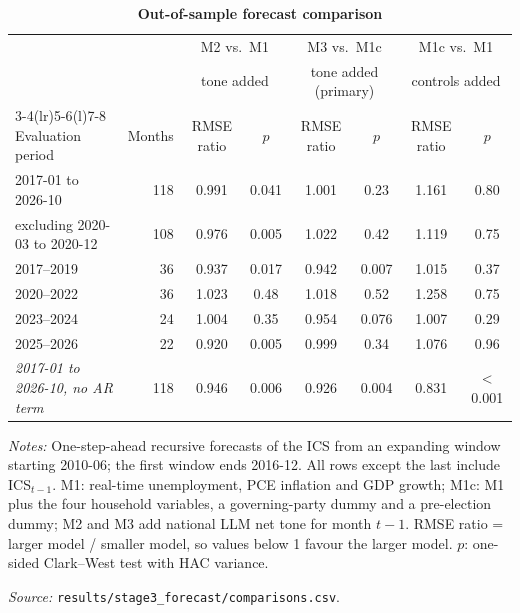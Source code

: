 \begin{table}[htbp]
\centering
\begin{threeparttable}
\caption{\textbf{Out-of-sample forecast comparison}}
\label{tab:forecast}
\small
\begin{tabular}{@{}l r c c c c c c@{}}
\toprule
 & & \multicolumn{2}{c}{M2 vs.\ M1} & \multicolumn{2}{c}{M3 vs.\ M1c} & \multicolumn{2}{c}{M1c vs.\ M1} \\
 & & \multicolumn{2}{c}{tone added} & \multicolumn{2}{c}{tone added (primary)} & \multicolumn{2}{c}{controls added} \\
\cmidrule(lr){3-4}\cmidrule(lr){5-6}\cmidrule(l){7-8}
Evaluation period & Months & RMSE ratio & $p$ & RMSE ratio & $p$ & RMSE ratio & $p$ \\
\midrule
2017-01 to 2026-10 & 118 & 0.991 & 0.041 & 1.001 & 0.23 & 1.161 & 0.80 \\
\quad excluding 2020-03 to 2020-12 & 108 & 0.976 & 0.005 & 1.022 & 0.42 & 1.119 & 0.75 \\
2017--2019 & 36 & 0.937 & 0.017 & 0.942 & 0.007 & 1.015 & 0.37 \\
2020--2022 & 36 & 1.023 & 0.48 & 1.018 & 0.52 & 1.258 & 0.75 \\
2023--2024 & 24 & 1.004 & 0.35 & 0.954 & 0.076 & 1.007 & 0.29 \\
2025--2026 & 22 & 0.920 & 0.005 & 0.999 & 0.34 & 1.076 & 0.96 \\
\addlinespace
\textit{2017-01 to 2026-10, no AR term} & 118 & 0.946 & 0.006 & 0.926 & 0.004 & 0.831 & < 0.001 \\
\bottomrule
\end{tabular}
\begin{tablenotes}[flushleft]\footnotesize
\item \textit{Notes:} One-step-ahead recursive forecasts of the ICS from an expanding window starting 2010-06; the first window ends 2016-12. All rows except the last include ICS$_{t-1}$. M1: real-time unemployment, PCE inflation and GDP growth; M1c: M1 plus the four household variables, a governing-party dummy and a pre-election dummy; M2 and M3 add national LLM net tone for month $t-1$. RMSE ratio = larger model / smaller model, so values below 1 favour the larger model. $p$: one-sided Clark--West test with HAC variance.
\item \textit{Source:} \texttt{results/stage3\_forecast/comparisons.csv}.
\end{tablenotes}
\end{threeparttable}
\end{table}
